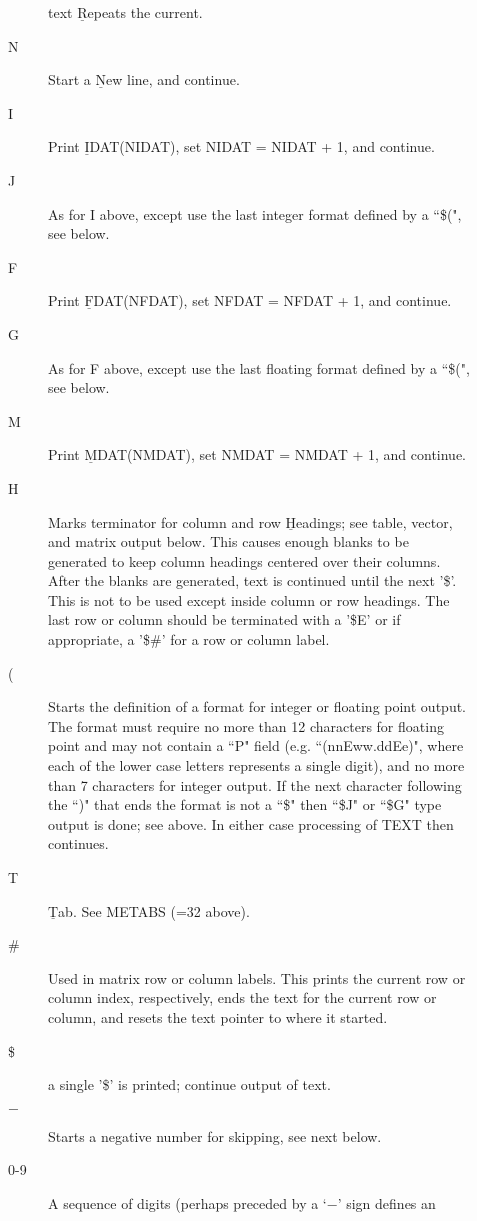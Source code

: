\documentclass[twoside]{MATH77}
\begin{document}
\begin{description}
\begin{description}
        text $\underline{\text{R}}$epeats the current.
\item[N] Start a $\underline{\text{N}}$ew line, and continue.
\item[I] Print $\underline{\text{I}}$DAT(NIDAT), set NIDAT = NIDAT + 1,
         and continue.
\item[J] As for I above, except use the last integer format
         defined by a ``\$(", see below.
\item[F] Print $\underline{\text{F}}$DAT(NFDAT), set NFDAT = NFDAT + 1,
         and continue.
\item[G] As for F above, except use the last floating format
         defined by a ``\$(", see below.
\item[M] Print $\underline{\text{M}}$DAT(NMDAT), set NMDAT = NMDAT + 1,
         and continue.
\item[H] Marks terminator for column and row $\underline{\text{H}}$eadings;
        see table, vector, and matrix output below.  This causes enough
        blanks to be generated to keep column headings centered over their
        columns.  After the blanks are generated, text is continued
        until the next '\$'.  This is not to be used except inside
        column or row headings.  The last row or column should be
        terminated with a '\$E' or if appropriate, a '\$\#' for a row or
        column label.
\item[(] Starts the definition of a format for integer or floating
        point output.  The format must require no more than 12
        characters for floating point and may not contain a ``P" field
        (e.g. ``(nnEww.ddEe)", where each of the lower case letters
        represents a single digit), and no more than 7 characters for
        integer output.  If the next character following the ``)" that
        ends the format is not a ``\$" then ``\$J" or ``\$G" type output
        is done; see above.  In either case processing of TEXT then
        continues.
\item[T] $\underline{\text{T}}$ab.  See METABS (=32 above).
\item[\#] Used in matrix row or column labels.  This prints the current
        row or column index, respectively, ends the text for the
        current row or column, and resets the text pointer to where
        it started.
\item[\$] a single '\$' is printed; continue output of text.
\item[$-$] Starts a negative number for skipping, see next below.
\item[0-9] A sequence of digits (perhaps preceded by a `$-$' sign defines an

\end{description}
\end{description}
\end{document}
